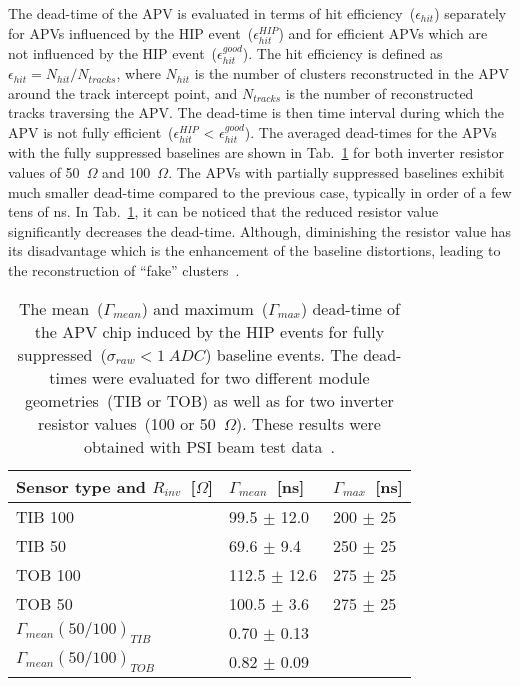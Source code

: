 The dead-time of the APV is evaluated in terms of hit efficiency~($\epsilon_{hit}$) separately for APVs influenced by the HIP event~($\epsilon_{hit}^{HIP}$) and for efficient APVs which are not influenced by the HIP event~($\epsilon_{hit}^{good}$). The hit efficiency is defined as $\epsilon_{hit} = N_{hit}/N_{tracks}$, where $N_{hit}$ is the number of clusters reconstructed in the APV around the track intercept point, and $N_{tracks}$ is the number of reconstructed tracks traversing the APV. The dead-time is then time interval during which the APV is not fully efficient~($\epsilon_{hit}^{HIP}$ < $\epsilon_{hit}^{good}$). The averaged dead-times for the APVs with the fully suppressed baselines are shown in Tab.~\ref{tab:tableDeadtimes} for both inverter resistor values of 50~$\Omega$ and 100~$\Omega$. The APVs with partially suppressed baselines exhibit much smaller dead-time compared to the previous case, typically in order of a few tens of ns. In Tab.~\ref{tab:tableDeadtimes}, it can be noticed that the reduced resistor value significantly decreases the dead-time. Although, diminishing the resistor value has its disadvantage which is the enhancement of the baseline distortions, leading to the reconstruction of ``fake'' clusters~\cite{Bainbridge:2004jc}.



\begin{table}[h]
\begin{center}
\begin{tabular}{|l|l|l|}
\hline
Sensor type and $R_{inv}$~[$\Omega$] & $\Gamma_{mean}$~[ns]  & $\Gamma_{max}$~[ns] \\
\hline
\hline
TIB 100 & 99.5 $\pm$ 12.0 & 200 $\pm$ 25 \\
TIB 50 & 69.6 $\pm$ 9.4 & 250 $\pm$ 25 \\
TOB 100 & 112.5 $\pm$ 12.6 & 275 $\pm$ 25 \\
TOB 50 & 100.5 $\pm$ 3.6 & 275 $\pm$ 25 \\
\hline
$\Gamma_{mean} (50/100)_{TIB}$&  0.70 $\pm$ 0.13  & \\
$\Gamma_{mean} (50/100)_{TOB}$&  0.82 $\pm$ 0.09 & \\
\hline
\end{tabular}
\caption[Table caption text]{The mean~($\Gamma_{mean}$) and maximum~($\Gamma_{max}$) dead-time of the APV chip induced by the HIP events for fully suppressed~($\sigma_{raw}<1~ADC$) baseline events. The dead-times were evaluated for two different module geometries~(TIB or TOB) as well as for two inverter resistor values~(100 or 50~$\Omega$). These results were obtained with PSI beam test data~\cite{Bainbridge:2004jc}. }
\label{tab:tableDeadtimes}
\end{center}
\end{table}



